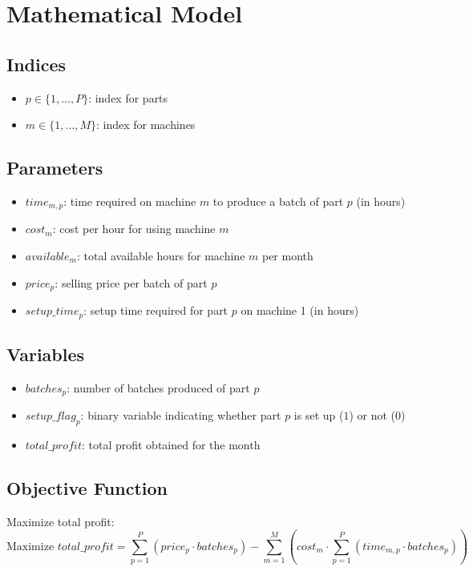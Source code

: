 \documentclass{article}
\begin{document}
\section*{Mathematical Model}

\subsection*{Indices}
\begin{itemize}
    \item $p \in \{1, \ldots, P\}$: index for parts
    \item $m \in \{1, \ldots, M\}$: index for machines
\end{itemize}

\subsection*{Parameters}
\begin{itemize}
    \item $time_{m,p}$: time required on machine $m$ to produce a batch of part $p$ (in hours)
    \item $cost_{m}$: cost per hour for using machine $m$
    \item $available_{m}$: total available hours for machine $m$ per month
    \item $price_{p}$: selling price per batch of part $p$
    \item $setup\_time_{p}$: setup time required for part $p$ on machine 1 (in hours)
\end{itemize}

\subsection*{Variables}
\begin{itemize}
    \item $batches_{p}$: number of batches produced of part $p$
    \item $setup\_flag_{p}$: binary variable indicating whether part $p$ is set up ($1$) or not ($0$)
    \item $total\_profit$: total profit obtained for the month
\end{itemize}

\subsection*{Objective Function}
Maximize total profit:
\[
\text{Maximize } total\_profit = \sum_{p=1}^{P} (price_{p} \cdot batches_{p}) - \sum_{m=1}^{M} \left( cost_{m} \cdot \sum_{p=1}^{P} (time_{m,p} \cdot batches_{p}) \right)
\]
\end{document}
